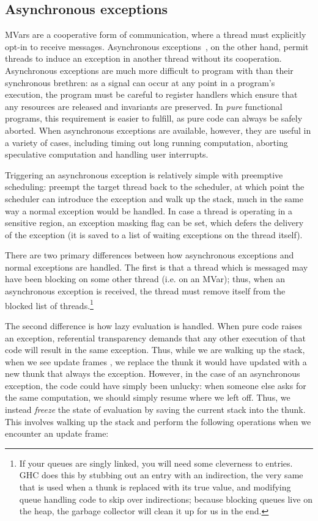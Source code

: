 \subsection{Asynchronous exceptions}

MVars are a cooperative form of communication, where a thread must
explicitly opt-in to receive messages.  Asynchronous
exceptions~\cite{Marlow:2001:AEH:378795.378858}, on the other hand,
permit threads to induce an exception in another thread
without its cooperation.  Asynchronous exceptions are much more
difficult to program with than their synchronous brethren: as a signal can
occur at any point in a program's execution, the program must be careful
to register handlers which ensure that any resources are released and
invariants are preserved.  In \emph{pure} functional programs, this requirement
is easier to fulfill, as pure code can always be safely aborted.  When
asynchronous exceptions are available, however, they are useful
in a variety of cases, including timing out long running computation,
aborting speculative computation and handling user interrupts.

Triggering an asynchronous exception is relatively simple with
preemptive scheduling: preempt the target thread back to the scheduler,
at which point the scheduler can introduce the exception and walk up the
stack, much in the same way a normal exception would be handled.  In
case a thread is operating in a sensitive region, an exception masking
flag can be set, which defers the delivery of the exception (it is saved
to a list of waiting exceptions on the thread itself).

There are two primary differences between how asynchronous exceptions
and normal exceptions are handled.  The first is that a thread which is
messaged may have been blocking on some other thread (i.e. on an MVar);
thus, when an asynchronous exception is received, the thread must remove
itself from the blocked list of threads.\footnote{If your queues are
    singly linked, you will need some cleverness to entries. GHC does
    this by stubbing out an entry with an indirection, the very same
that is used when a thunk is replaced with its true value, and modifying
queue handling code to skip over indirections; because blocking queues
live on the heap, the garbage collector will clean it up for us in the end.}

The second difference is how lazy evaluation is handled. When pure code
raises an exception, referential transparency demands that any other
execution of that code will result in the same exception.  Thus, while
we are walking up the stack, when we see update frames ,
we replace the thunk it would have updated with a new thunk that always
the exception.  However, in the case of an asynchronous exception, the
code could have simply been unlucky: when someone else asks for the same
computation, we should simply resume where we left off.  Thus, we
instead \emph{freeze} the state of evaluation by saving the current
stack into the thunk.~\cite{Reid1999}  This involves walking up the stack
and perform the following operations when we encounter an update frame:


